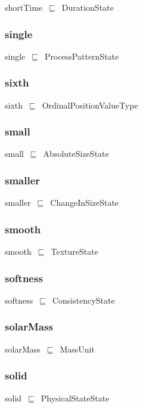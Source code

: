 \documentclass{article}
\begin{document}
shortTime~\ensuremath{\sqsubseteq}~DurationState~

\subsubsection*{single}

single~\ensuremath{\sqsubseteq}~ProcessPatternState~

\subsubsection*{sixth}

sixth~\ensuremath{\sqsubseteq}~OrdinalPositionValueType~

\subsubsection*{small}

small~\ensuremath{\sqsubseteq}~AbsoluteSizeState~

\subsubsection*{smaller}

smaller~\ensuremath{\sqsubseteq}~ChangeInSizeState~

\subsubsection*{smooth}

smooth~\ensuremath{\sqsubseteq}~TextureState~

\subsubsection*{softness}

softness~\ensuremath{\sqsubseteq}~ConsistencyState~

\subsubsection*{solarMass}

solarMass~\ensuremath{\sqsubseteq}~MassUnit~

\subsubsection*{solid}

solid~\ensuremath{\sqsubseteq}~PhysicalStateState~
\end{document}

